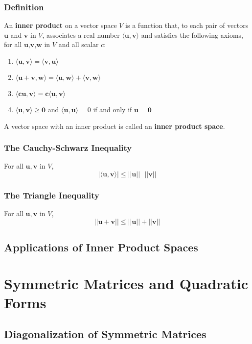 \documentclass[letterpaper,11pt]{article}
\begin{document}
			\subsubsection{Definition}
				An \textbf{inner product} on a vector space $V$ is a function that, to each pair of vectors $\mathbf{u}$ and $\mathbf{v}$ in $V$, associates a real number $\langle\mathbf{u,v}\rangle$ and satisfies the following axioms, for all $\mathbf{u}$,$\mathbf{v}$,$\mathbf{w}$ in $V$ and all scalar $c$:
				\begin{enumerate}
					\item $\mathbf{\langle\mathbf{u,v}\rangle=\langle\mathbf{v},\mathbf{u}\rangle}$
					\item $\mathbf{\langle\mathbf{u}+\mathbf{v},\mathbf{w}\rangle=\langle\mathbf{u,w}\rangle+\langle\mathbf{v},\mathbf{w}\rangle}$
					\item $\mathbf{\langle c\mathbf{u,v}\rangle=c\langle\mathbf{u,v}\rangle}$
					\item $\mathbf{\langle\mathbf{u,v}\rangle\geq 0}$ and $\langle\mathbf{u,u}\rangle=0$ if and only if $\mathbf{u=0}$
				\end{enumerate}
				A vector space with an inner product is called an \textbf{inner product space}.
			\subsubsection{The Cauchy-Schwarz Inequality}
				For all $\mathbf{u,v}$ in $V$,
				\begin{equation}
					\mathbf{|\langle u,v\rangle|\leq ||u||\textrm{ }||v||}
				\end{equation}
			\subsubsection{The Triangle Inequality}
				For all $\mathbf{u,v}$ in $V$,
				\begin{equation}
					\mathbf{||u+v||\leq ||u||+||v||}
				\end{equation}
		\subsection{Applications of Inner Product Spaces}
	\section{Symmetric Matrices and Quadratic Forms}
		\subsection{Diagonalization of Symmetric Matrices}
\end{document}
